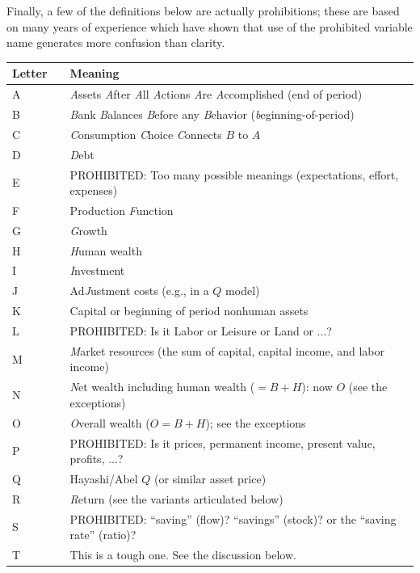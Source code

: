 \documentclass{econark}
\begin{document}
Finally, a few of the definitions below are actually prohibitions; these are based on many years of experience which have shown that use of the prohibited variable name generates more confusion than clarity.

\hypertarget{RomanLetters}{}
\begin{table}[ht]
  \centering
  \begin{tabular}{|lcl|}   \hline
    Letter & & Meaning
    \\ \hline
    A & & \textit{A}ssets \textit{A}fter \textit{A}ll \textit{A}ctions \textit{A}re \textit{A}ccomplished (end of period)\\
    B & & \textit{B}ank \textit{B}alances \textit{B}efore any \textit{B}ehavior (\textit{b}eginning-of-period)\\
    C & & \textit{C}onsumption \textit{C}hoice \textit{C}onnects $B$ to $A$\\
    D & & \textit{D}ebt\\
    E & & PROHIBITED:  Too many possible meanings (expectations, effort, expenses)\\
    F & & Production \textit{F}unction\\
    G & & \textit{G}rowth\\
    H & & \textit{H}uman wealth\\
    I & & \textit{I}nvestment\\
    J & & Ad\textit{J}ustment costs (e.g., in a $Q$ model)\\
    K & & Capital or beginning of period nonhuman assets\\
    L & & PROHIBITED: Is it Labor or Leisure or Land or ...?\\
    M & & \textit{M}arket resources (the sum of capital, capital income, and labor income)\\
    N & & \textit{N}et wealth including human wealth ($=B + H$): now $O$ (see the exceptions)\\
    O & & \textit{O}verall wealth ($O = B + H$); see the exceptions\\
    P & & PROHIBITED: Is it prices, permanent income, present value, profits, ...?\\
    Q & & Hayashi/Abel $Q$ (or similar asset price)\\
    R & & \textit{R}eturn (see the variants articulated below)\\
    S & & PROHIBITED: ``saving'' (flow)? ``savings'' (stock)? or the ``saving rate'' (ratio)?\\
    T & & This is a tough one.  See the discussion below.\\

\end{tabular}
\end{table}
\end{document}
